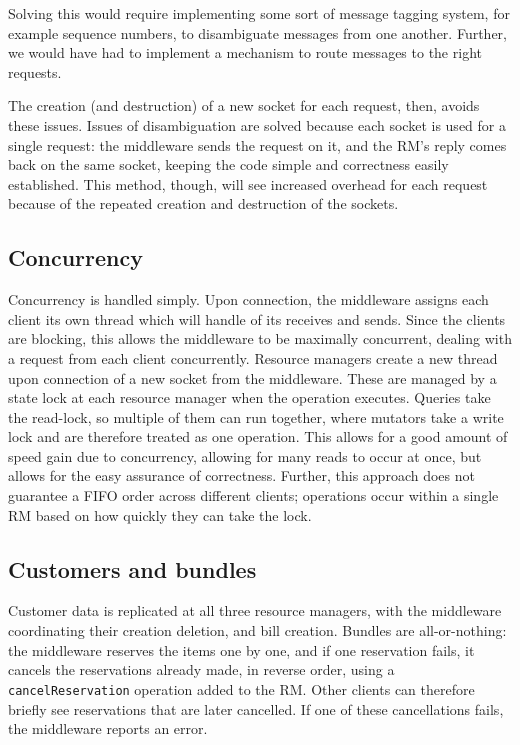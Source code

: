 \documentclass[10pt]{article}
\newcommand{\code}[1]{\lstinline{#1}}
\begin{document}
Solving this would require implementing some sort of message tagging system, for
example sequence numbers, to disambiguate messages from one another. Further, we
would have had to implement a mechanism to route messages to the right
requests.

The creation (and destruction) of a new socket for each request, then, avoids
these issues. Issues of disambiguation are solved because each socket is used
for a single request: the middleware sends the request on it, and the RM's reply
comes back on the same socket, keeping the code simple and correctness easily
established. This method, though, will see increased overhead for each request
because of the repeated creation and destruction of the sockets.

\subsection{Concurrency}
Concurrency is handled simply. Upon connection, the middleware assigns each
client its own thread which will handle of its receives and sends. Since the
clients are blocking, this allows the middleware to be maximally concurrent,
dealing with a request from each client concurrently. Resource managers create a
new thread upon connection of a new socket from the middleware. These are
managed by a state lock at each resource manager when the operation
executes. Queries take the read-lock, so multiple of them can run together,
where mutators take a write lock and are therefore treated as one
operation. This allows for a good amount of speed gain due to concurrency,
allowing for many reads to occur at once, but allows for the easy assurance of
correctness. Further, this approach does not guarantee a FIFO order across
different clients; operations occur within a single RM based on how quickly they
can take the lock.


\subsection{Customers and bundles}
Customer data is replicated at all three resource managers, with the middleware
coordinating their creation deletion, and bill creation. Bundles are
all-or-nothing: the middleware reserves the items one by one, and if one
reservation fails, it cancels the reservations already made, in reverse order,
using a \code{cancelReservation} operation added to the RM. Other clients can
therefore briefly see reservations that are later cancelled. If one of these
cancellations fails, the middleware reports an error.
\end{document}
